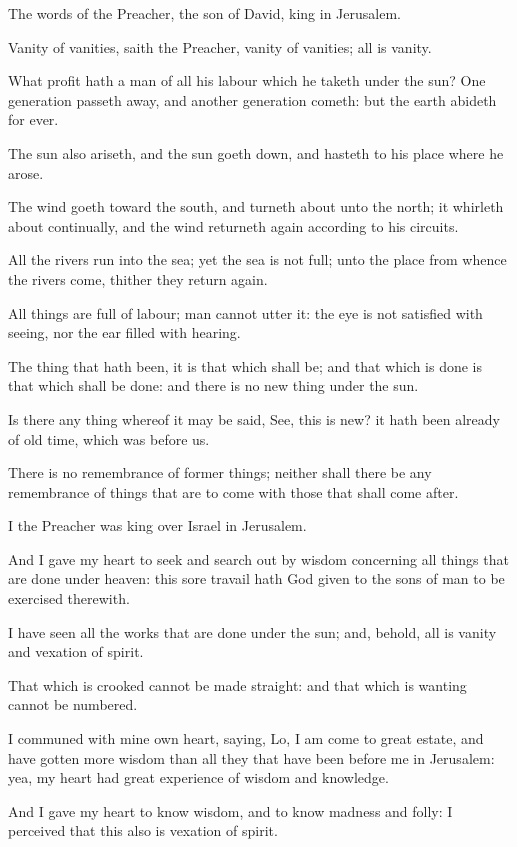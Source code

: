 \Chapter
\Verse The words of the Preacher, the son of David, king in Jerusalem.

\Verse Vanity of vanities, saith the Preacher, vanity of vanities; all is vanity.

\Verse What profit hath a man of all his labour which he taketh under the sun?  \Verse One generation passeth away, and another generation cometh: but the earth abideth for ever.

\Verse The sun also ariseth, and the sun goeth down, and hasteth to his place where he arose.

\Verse The wind goeth toward the south, and turneth about unto the north; it whirleth about continually, and the wind returneth again according to his circuits.

\Verse All the rivers run into the sea; yet the sea is not full; unto the place from whence the rivers come, thither they return again.

\Verse All things are full of labour; man cannot utter it: the eye is not satisfied with seeing, nor the ear filled with hearing.

\Verse The thing that hath been, it is that which shall be; and that which is done is that which shall be done: and there is no new thing under the sun.

\Verse Is there any thing whereof it may be said, See, this is new? it hath been already of old time, which was before us.

\Verse There is no remembrance of former things; neither shall there be any remembrance of things that are to come with those that shall come after.

\Verse I the Preacher was king over Israel in Jerusalem.

\Verse And I gave my heart to seek and search out by wisdom concerning all things that are done under heaven: this sore travail hath God given to the sons of man to be exercised therewith.

\Verse I have seen all the works that are done under the sun; and, behold, all is vanity and vexation of spirit.

\Verse That which is crooked cannot be made straight: and that which is wanting cannot be numbered.

\Verse I communed with mine own heart, saying, Lo, I am come to great estate, and have gotten more wisdom than all they that have been before me in Jerusalem: yea, my heart had great experience of wisdom and knowledge.

\Verse And I gave my heart to know wisdom, and to know madness and folly: I perceived that this also is vexation of spirit.

